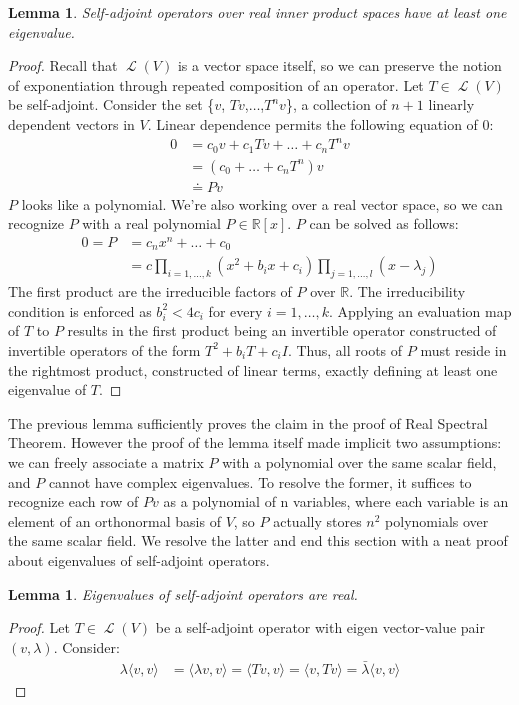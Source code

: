 \documentclass[letterpaper,12pt]{article}
\newtheorem{lemma}[theorem]{Lemma}
\newcommand{\langlerangle}[1]{\langle{#1}\rangle}
\begin{document}
\begin{lemma}
Self-adjoint operators over real inner product spaces have at least one eigenvalue.
\end{lemma}
\begin{proof}
Recall that $\operatorname{\mathcal{L}}(V)$ is a vector space itself, so we can preserve the notion of exponentiation through repeated composition of an operator. Let $T \in \operatorname{\mathcal{L}}(V)$ be self-adjoint. Consider the set \{$v$, $Tv$,$\dots$,$T^{n}v$\}, a collection of $n+1$ linearly dependent vectors in $V$. Linear dependence permits the following equation of 0:
\begin{align}
    0 &= c_0 v + c_1 Tv +\dots+ c_n T^{n}v\\
      &= (c_0 +\dots+c_n T^{n})v \\
      &\doteq Pv
\end{align}
$P$ looks like a polynomial. We're also working over a real vector space, so we can recognize $P$ with a real polynomial $P\in \mathbb{R}[x]$. $P$ can be solved as follows:
\begin{align}
    0 = P &= c_n x^{n} +\dots+c_0 \\
    &= c\prod_{i=1,\dots,k}(x^{2} + b_{i}x + c_{i})\prod_{j=1,\dots,l}(x-\lambda_j) 
\end{align}
The first product are the irreducible factors of $P$ over $\mathbb{R}$. The irreducibility condition is enforced as $b_{i}^{2}<4c_{i}$ for every $i=1,\dots,k$. Applying an evaluation map of $T$ to $P$ results in the first product being an invertible operator constructed of invertible operators of the form $T^{2} + b_{i}T + c_{i}I$. Thus, all roots of $P$ must reside in the rightmost product, constructed of linear terms, exactly defining at least one eigenvalue of $T$.
\end{proof}
The previous lemma sufficiently proves the claim in the proof of Real Spectral Theorem. However the proof of the lemma itself made implicit two assumptions: we can freely associate a matrix $P$ with a polynomial over the same scalar field, and $P$ cannot have complex eigenvalues. To resolve the former, it suffices to recognize each row of $Pv$ as a polynomial of n variables, where each variable is an element of an orthonormal basis of $V$, so $P$ actually stores $n^{2}$ polynomials over the same scalar field. We resolve the latter and end this section with a neat proof about eigenvalues of self-adjoint operators.
\begin{lemma}
Eigenvalues of self-adjoint operators are real. 
\end{lemma}
\begin{proof}
Let $T \in \operatorname{\mathcal{L}}(V)$ be a self-adjoint operator with eigen vector-value pair $(v, \lambda)$. Consider:
\begin{align}
    \lambda\langlerangle{v,v} &=
    \langlerangle{\lambda v,v}=\langlerangle{Tv,v}= \langlerangle{v,Tv} =
    \bar{\lambda}\langlerangle{v,v}
\end{align}
\end{proof}
\end{document}
